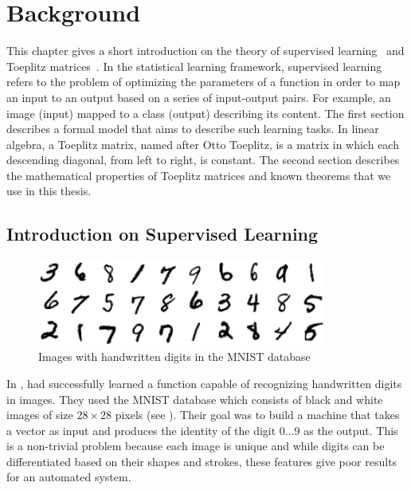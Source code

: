 \chapter{Background}
\label{chapter:ch2-background}
\localtoc

This chapter gives a short introduction on the theory of supervised learning~\cite{shalev2014understanding} and Toeplitz matrices~\cite{gray2006toeplitz}.
In the statistical learning framework, supervised learning refers to the problem of optimizing the parameters of a function in order to map an input to an output based on a series of input-output pairs.
For example, an image (input) mapped to a class (output) describing its content.
The first section describes a formal model that aims to describe such learning tasks.
In linear algebra, a Toeplitz matrix, named after Otto Toeplitz, is a matrix in which each descending diagonal, from left to right, is constant.
The second section describes the mathematical properties of Toeplitz matrices and known theorems that we use in this thesis. 


\section{Introduction on Supervised Learning}
\label{section:ch2-introduction_on_supervised_learning}

\begin{figure}[t]
  \centering
  \includegraphics[width=0.85\textwidth]{figures/main/ch2-background/mnist-dataset.png}
  \caption{Images with handwritten digits in the MNIST database \cite{lecun1998gradient}}
  \label{figure:ch2-mnist-database}
\end{figure}


In \citeyear{lecun1998gradient}, \citeauthor{lecun1998gradient} had successfully learned a function capable of recognizing handwritten digits in images.
They used the MNIST database \cite{lecun1998gradient} which consists of black and white images of size $28 \times 28$ pixels (see ).
Their goal was to build a machine that takes a vector as input and produces the identity of the digit $0 \dots 9$ as the output.
This is a non-trivial problem because each image is unique and while digits can be differentiated based on their shapes and strokes, these features give poor results for an automated system. 

